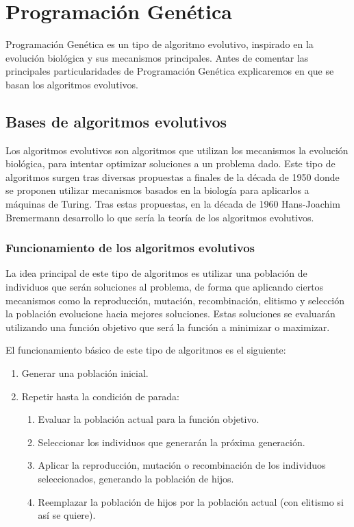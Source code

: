 \section{Programación Genética}

Programación Genética es un tipo de algoritmo evolutivo, inspirado en la evolución biológica y sus mecanismos principales. Antes de comentar las principales particularidades de Programación Genética explicaremos en que se basan los algoritmos evolutivos.

\subsection{Bases de algoritmos evolutivos}

Los algoritmos evolutivos son algoritmos que utilizan los mecanismos la evolución biológica, para intentar optimizar soluciones a un problema dado. Este tipo de algoritmos surgen tras diversas propuestas a finales de la década de 1950 \cite{historiaAlgoritmosEvolutivos} donde se proponen utilizar mecanismos basados en la biología para aplicarlos a máquinas de Turing. Tras estas propuestas, en la década de 1960 Hans-Joachim Bremermann desarrollo lo que sería la teoría de los algoritmos evolutivos.

\subsubsection{Funcionamiento de los algoritmos evolutivos}

La idea principal de este tipo de algoritmos es utilizar una población de individuos que serán soluciones al problema, de forma que aplicando ciertos mecanismos como la reproducción, mutación, recombinación, elitismo y selección la población evolucione hacia mejores soluciones. Estas soluciones se evaluarán utilizando una función objetivo que será la función a minimizar o maximizar.

El funcionamiento básico de este tipo de algoritmos es el siguiente:

\begin{enumerate}
	\item Generar una población inicial.
	\item Repetir hasta la condición de parada:
	\begin{enumerate}
		\item Evaluar la población actual para la función objetivo.
		\item Seleccionar los individuos que generarán la próxima generación.
		\item Aplicar la reproducción, mutación o recombinación de los individuos seleccionados, generando la población de hijos.
		\item Reemplazar la población de hijos por la población actual (con elitismo si así se quiere).
	\end{enumerate}
\end{enumerate}

